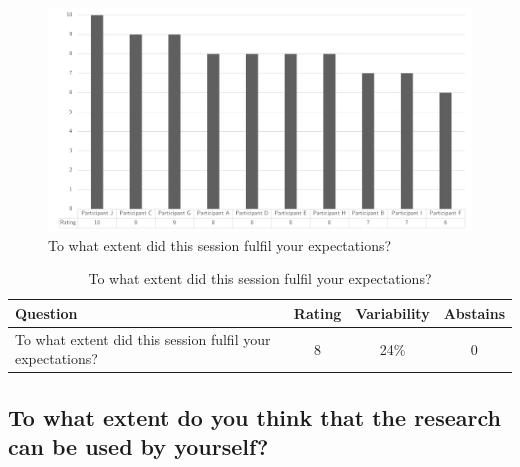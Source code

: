 \begin{figure}[H]
	\centering
	\includegraphics[width=0.9\linewidth]{images/validationresult_fulfilexpectations}
	\caption[To what extent did this session fulfil your expectations?]{To what extent did this session fulfil your expectations?}
	\label{fig:fulfilexpectations}
\end{figure}
\begin{table}[H]
	\centering
	\begin{tabular}{p{}ccc}
		\toprule
		\textbf{Question} & \textbf{Rating} & \textbf{Variability} & \textbf{Abstains} \\
		\midrule
		To what extent did this session fulfil your expectations? & 8 & 24\% & 0 \\%
		\bottomrule
	\end{tabular}%
	\caption[To what extent did this session fulfil your expectations?]{To what extent did this session fulfil your expectations?}
	\label{tab:fulfilexpectations}%
\end{table}%

\subsection{To what extent do you think that the research can be used by yourself?}
\label{sub:validationrelevantyourself}


